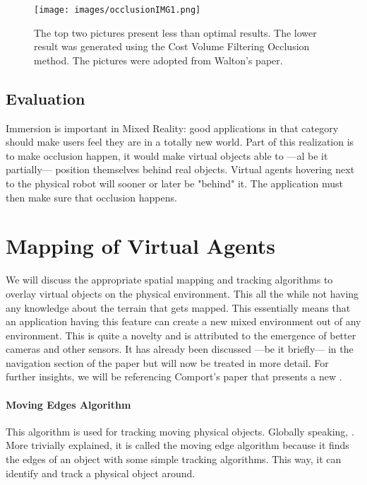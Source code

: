 \begin{figure}[!htb]
	\texttt{[image: images/occlusionIMG1.png]}
	\centering
	\caption{The top two pictures present less than optimal results. The lower result was generated using the Cost Volume Filtering Occlusion method. The pictures were adopted from Walton's paper\cite{walton2017accurate}. }
\end{figure}

\subsection{Evaluation}
Immersion is important in Mixed Reality: good applications in that category should make users feel they are in a totally new world\cite{mestre2006immersion}. Part of this realization is to make occlusion happen, it would make virtual objects able to ---al be it partially--- position themselves behind real objects. Virtual agents hovering next to the physical robot will sooner or later be "behind" it. The application must then make sure that occlusion happens.

\section{Mapping of Virtual Agents}
We will discuss the appropriate spatial mapping and tracking algorithms to overlay virtual objects on the physical environment. This all the while not having any knowledge about the terrain that gets mapped. This essentially means that an application having this feature can create a new mixed environment out of any environment. This is quite a novelty and is attributed to the emergence of better cameras and other sensors. It has already been discussed ---be it briefly--- in the navigation section of the paper but will now be treated in more detail. For further insights, we will be referencing Comport's paper\cite{comport2003real} that presents a new .

\paragraph{Moving Edges Algorithm}
This algorithm is used for tracking moving physical objects. Globally speaking, . More trivially explained, it is called the moving edge algorithm because it finds the edges of an object with some simple tracking algorithms. This way, it can identify and track a physical object around. 

